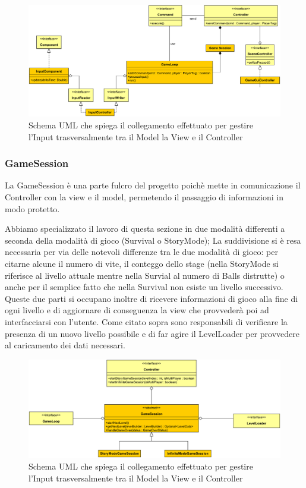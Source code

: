 \documentclass[a4paper,12pt]{report}
\begin{document}
\begin{figure}[H]
\includegraphics[width=\linewidth]{img/input}
\caption{Schema UML che spiega il collegamento effettuato per gestire l'Input trasversalmente tra il Model la View e il Controller}
\label{img:input}
\end{figure}

\subsubsection*{GameSession}

La GameSession è una parte fulcro del progetto poichè mette in comunicazione il Controller con la view e il model, permetendo il passaggio di informazioni in modo protetto.

Abbiamo specializzato il lavoro di questa sezione in due modalità differenti a seconda della modalità di gioco (Survival o StoryMode); 
La suddivisione si è resa necessaria per via delle notevoli differenze tra le due modalità di gioco: per citarne alcune il numero di vite, il conteggo dello stage (nella StoryMode si riferisce al livello attuale mentre nella Survial al numero di Balls distrutte) o anche per il semplice fatto che nella Survival non esiste un livello successivo.
Queste due parti si occupano inoltre di ricevere informazioni di gioco alla fine di ogni livello e di aggiornare di conseguenza la view che provvederà poi ad interfacciarsi con l'utente.
Come citato sopra sono responsabili di verificare la presenza di un nuovo livello possibile e di far agire il LevelLoader per provvedere al caricamento dei dati necessari.

\begin{figure}[H]
\includegraphics[width=\linewidth]{img/gamesession}
\caption{Schema UML che spiega il collegamento effettuato per gestire l'Input trasversalmente tra il Model la View e il Controller}
\label{img:gamesession}
\end{figure}
\end{document}
